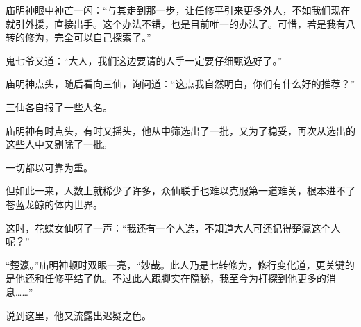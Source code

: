 \begin{this_body}
庙明神眼中神芒一闪：“与其走到那一步，让任修平引来更多外人，不如我们现在就引外援，直接出手。这个办法不错，也是目前唯一的办法了。可惜，若是我有八转的修为，完全可以自己探索了。”

鬼七爷又道：“大人，我们这边要请的人手一定要仔细甄选好了。”

庙明神点头，随后看向三仙，询问道：“这点我自然明白，你们有什么好的推荐？”

三仙各自报了一些人名。

庙明神有时点头，有时又摇头，他从中筛选出了一批，又为了稳妥，再次从选出的这些人中又剔除了一批。

一切都以可靠为重。

但如此一来，人数上就稀少了许多，众仙联手也难以克服第一道难关，根本进不了苍蓝龙鲸的体内世界。

这时，花蝶女仙呀了一声：“我还有一个人选，不知道大人可还记得楚瀛这个人呢？”

“楚瀛。”庙明神顿时双眼一亮，“妙哉。此人乃是七转修为，修行变化道，更关键的是他还和任修平结了仇。不过此人跟脚实在隐秘，我至今为打探到他更多的消息……”

说到这里，他又流露出迟疑之色。

\end{this_body}

